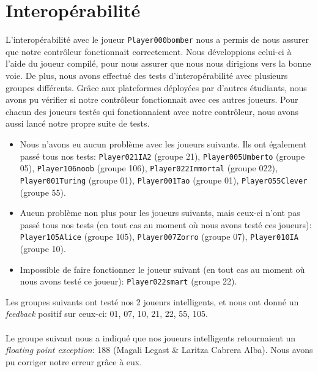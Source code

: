 \documentclass{article}
\begin{document}
\section{Interopérabilité}
L'interopérabilité avec le joueur \texttt{Player000bomber} nous a permis de nous assurer que notre contrôleur fonctionnait correctement. Nous développions celui-ci à l'aide du joueur compilé, pour nous assurer que nous nous dirigions vers la bonne voie. De plus, nous avons effectué des tests d'interopérabilité avec plusieurs groupes différents. Grâce aux plateformes déployées par d'autres étudiants, nous avons pu vérifier si notre contrôleur fonctionnait avec ces autres joueurs. Pour chacun des joueurs testés qui fonctionnaient avec notre contrôleur, nous avons aussi lancé notre propre suite de tests.
\begin{itemize}
	\item Nous n'avons eu aucun problème avec les joueurs suivants. Ils ont également passé tous nos tests: \texttt{Player021IA2} (groupe 21), \texttt{Player005Umberto} (groupe 05), \texttt{Player106noob} (groupe 106), \texttt{Player022Immortal} (groupe 022), \texttt{Player001Turing} (groupe 01), \texttt{Player001Tao} (groupe 01), \texttt{Player055Clever} (groupe 55).
	\item Aucun problème non plus pour les joueurs suivants, mais ceux-ci n'ont pas passé tous nos tests (en tout cas au moment où nous avons testé ces joueurs): \texttt{Player105Alice} (groupe 105), \texttt{Player007Zorro} (groupe 07), \texttt{Player010IA} (groupe 10).
	\item Impossible de faire fonctionner le joueur suivant (en tout cas au moment où nous avons testé ce joueur): \texttt{Player022smart} (groupe 22).
\end{itemize}
Les groupes suivants ont testé nos 2 joueurs intelligents, et nous ont donné un \emph{feedback} positif sur ceux-ci: 01, 07, 10, 21, 22, 55, 105. \\ \\
Le groupe suivant nous a indiqué que nos joueurs intelligents retournaient un \emph{floating point exception}: 188 (Magali Legast \& Laritza Cabrera Alba). Nous avons pu corriger notre erreur grâce à eux. 
\end{document}
